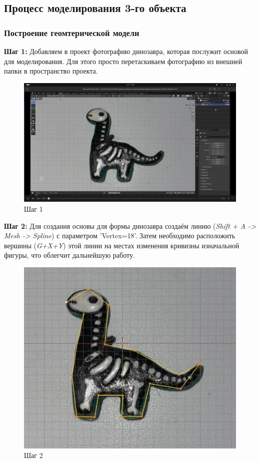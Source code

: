 \documentclass[areasetadvanced]{scrartcl}
\begin{document}
\newpage
\subsection{Процесс моделирования 3-го объекта}

\subsubsection{Построение геомтерической модели}
\par \textbf{Шаг 1:} Добавляем в проект фотографию динозавра, которая послужит основой для моделирования. Для этого просто перетаскиваем фотографию из внешней папки в пространство проекта.
\begin{figure}[H]
    \label{4} 
    \centering
    \includegraphics[width=0.8\linewidth]{dino/1.png}
    \caption{Шаг 1}
\end{figure}

\par \textbf{Шаг 2:} Для создания основы для формы динозавра создаём линию (\textit{Shift + A -> Mesh ->  Spline}) с параметром 'Vertex=18'. Затем необходимо расположить вершины (\textit{G+X+Y}) этой линии на местах изменения кривизны изначальной фигуры, что облегчит дальнейшую работу. 
\begin{figure}[H]
    \label{4} 
    \centering
    \includegraphics[width=0.6\linewidth]{dino/2.png}
    \caption{Шаг 2}
\end{figure}
\end{document}
